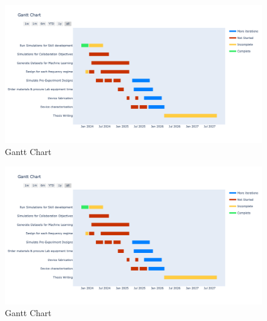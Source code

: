 \begin{figure}[h]
    \centering
    \includegraphics[width=\textwidth]{figures/introduction/gantt.png}
    \caption{Gantt Chart}
    \label{fig:your_label}
\end{figure}


\begin{figure}
    \centering
    \includegraphics[width=\textwidth]{figures/introduction/gantt.png}
    \caption{Gantt Chart}
    \label{fig:your_label}
\end{figure}